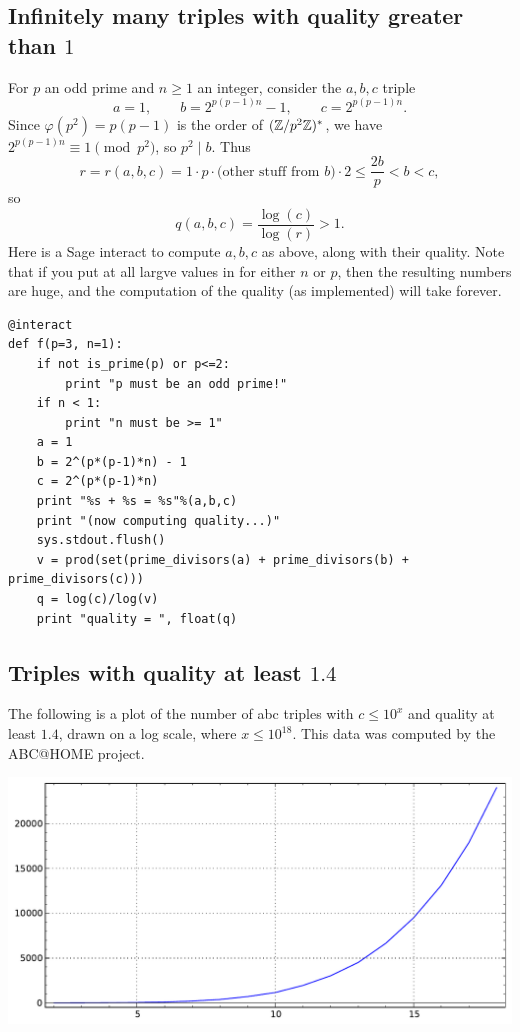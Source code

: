 \documentclass{book}
\begin{document}
\subsection{Infinitely many triples with quality greater than $1$}
For $p$ an odd prime and $n\geq 1$ an integer, consider the $a,b,c$ triple
$$
a = 1,\qquad b = 2^{p(p-1)n}-1, \qquad c = 2^{p(p-1)n}.
$$
Since $\varphi(p^2)=p(p-1)$ is the order of $(\mathbb{Z}/p^2\mathbb{Z})^*$,
we have $2^{p(p-1)n}\equiv 1 \pmod{p^2}$,
so $p^2 \mid b$.
Thus
$$
 r = r(a,b,c) = 1 \cdot p \cdot\text{(other stuff from $b$)} \cdot 2
     \leq \frac{2b}{p} < b < c,
$$
so
$$
 q(a,b,c) = \frac{\log(c)}{\log(r)} > 1.
$$
Here is a Sage interact to compute $a,b,c$ as above, along with their quality.
Note that if you put at all largve values in for either $n$ or $p$,
then the resulting numbers are huge, and the computation of the quality
(as implemented) will take forever.
\begin{lstlisting}
@interact
def f(p=3, n=1):
    if not is_prime(p) or p<=2:
        print "p must be an odd prime!"
    if n < 1:
        print "n must be >= 1"
    a = 1
    b = 2^(p*(p-1)*n) - 1
    c = 2^(p*(p-1)*n)
    print "%s + %s = %s"%(a,b,c)
    print "(now computing quality...)"
    sys.stdout.flush()
    v = prod(set(prime_divisors(a) + prime_divisors(b) + prime_divisors(c)))
    q = log(c)/log(v)
    print "quality = ", float(q)
\end{lstlisting}

\subsection{Triples with quality at least $1.4$}\label{sec:abchome}
The following is a plot of the number of abc triples with $c\leq 10^x$
and quality at least $1.4$, drawn on a log scale,
where $x\leq 10^{18}$.  This data was computed by the ABC@HOME project.
\begin{center}
\includegraphics[width=.7\textwidth]{pics/abcplot.pdf}
\end{center}
\end{document}
